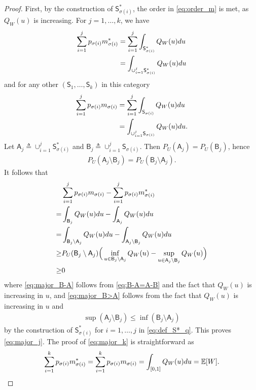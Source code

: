 \documentclass[10pt,a4paper]{amsart}
\newcommand{\E}{\mathbb{E}}
\def\sA{{\mathsf A}}
\def\sS{{\mathsf S}}
\def\rd{{\rm d}}
\def\deq{\triangleq}
\begin{document}
\begin{proof}
First, by the construction of $\sS^*_{\sigma(i)}$, the order in \eqref{eq:order_m} is met, as $Q_W(u)$ is increasing.
For $j=1,\ldots,k$, we have
\begin{align}
\sum_{i=1}^j p_{\sigma(i)} m^*_{\sigma(i)}
&= \sum_{i=1}^j \int_{\sS^*_{\sigma(i)}} Q_W(u) \rd u \\
&= \int_{\cup_{i=1}^j \sS^*_{\sigma(i)}} Q_W(u) \rd u
\end{align}
and for any other $(\sS_1,\ldots,\sS_k)$ in this category
\begin{align}
\sum_{i=1}^j p_{\sigma(i)} m_{\sigma(i)}
&= \sum_{i=1}^j \int_{\sS_{\sigma(i)}} Q_W(u) \rd u \\
&= \int_{\cup_{i=1}^j \sS_{\sigma(i)}} Q_W(u) \rd u .
\end{align}
Let $\sA_j \deq \cup_{i=1}^j \sS^*_{\sigma(i)}$ and ${\mathsf B}_j \deq \cup_{i=1}^j \sS_{\sigma(i)}$. Then $P_U(\sA_j) = P_U(\mathsf B_j)$, hence
\begin{align}
    P_U(\sA_j\setminus\mathsf B_j) = P_U(\mathsf B_j \setminus \sA_j) . \label{eq:B-A=A-B}
\end{align}
It follows that
\begin{align}
& \sum_{i=1}^j p_{\sigma(i)} m_{\sigma(i)} 
-
\sum_{i=1}^j p_{\sigma(i)} m^*_{\sigma(i)} \nonumber \\
=& 
\int_{\mathsf B_j} Q_W(u) \rd u 
-
\int_{\sA_j} Q_W(u) \rd u \\
=& \int_{\mathsf B_j\setminus\sA_j} Q_W(u) \rd u 
-
\int_{\sA_j\setminus\mathsf B_j} Q_W(u) \rd u \\
\ge& P_U(\mathsf B_j \setminus \sA_j) \Big( \inf_{u\in \mathsf B_j \setminus \sA_j} Q_W(u) - \sup_{u\in \mathsf A_j \setminus \mathsf B_j} Q_W(u)\Big) \label{eq:major_B-A} \\
\ge & 0  \label{eq:major_B>A}
\end{align}
where \eqref{eq:major_B-A} follows from \eqref{eq:B-A=A-B} and the fact that $Q_W(u)$ is increasing in $u$, and \eqref{eq:major_B>A} follows from the fact that $Q_W(u)$ is increasing in $u$ and 
\begin{align}
    \sup( \sA_j\setminus\mathsf B_j )
\le 
    \inf( \mathsf B_j\setminus\sA_j )
\end{align}
by the construction of $\sS^*_{\sigma(i)}$ for $i=1,\ldots,j$ in \eqref{eq:def_S*_q}.
This proves \eqref{eq:major_j}.
The proof of \eqref{eq:major_k} is straightforward as
\begin{align}
    \sum_{i=1}^k p_{\sigma(i)} m^*_{\sigma(i)}
    =
    \sum_{i=1}^k p_{\sigma(i)} m_{\sigma(i)} 
    = \int_{[0,1]} Q_W(u) \rd u  = \E[W]. \nonumber
\end{align}
\end{proof}
\end{document}
